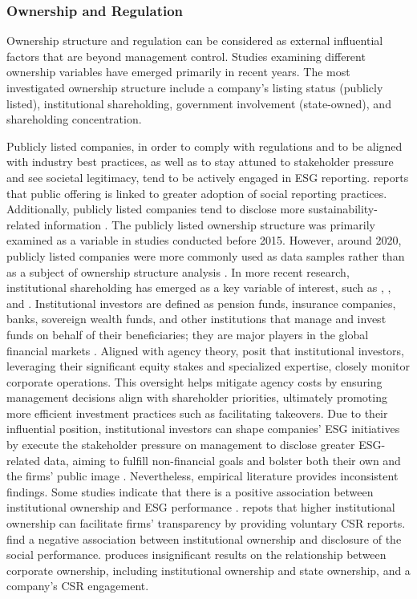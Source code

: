 \documentclass[
  authoryear]{elsarticle}
\begin{document}
\subsubsection{Ownership and Regulation}\label{ownership-and-regulation}

Ownership structure and regulation can be considered as external
influential factors that are beyond management control. Studies
examining different ownership variables have emerged primarily in recent
years. The most investigated ownership structure include a company's
listing status (publicly listed), institutional shareholding, government
involvement (state-owned), and shareholding concentration.

Publicly listed companies, in order to comply with regulations and to be
aligned with industry best practices, as well as to stay attuned to
stakeholder pressure and see societal legitimacy, tend to be actively
engaged in ESG reporting. \citet{HADDOCK2005} reports that public
offering is linked to greater adoption of social reporting practices.
Additionally, publicly listed companies tend to disclose more
sustainability-related information \citep{GAMERSCHLAG2011}. The publicly
listed ownership structure was primarily examined as a variable in
studies conducted before 2015. However, around 2020, publicly listed
companies were more commonly used as data samples rather than as a
subject of ownership structure analysis
\citep[e.g.][]{SAHASRANAMAM2020, AMEEN2022, ALOBAID2024}. In more recent
research, institutional shareholding has emerged as a key variable of
interest, such as \citet{DYCK2019}, \citet{CHEN2020}, and
\citet{AMEEN2022}. Institutional investors are defined as pension funds,
insurance companies, banks, sovereign wealth funds, and other
institutions that manage and invest funds on behalf of their
beneficiaries; they are major players in the global financial markets
\citep{AMEEN2022}. Aligned with agency theory, \citet{SHLEIFER1986}
posit that institutional investors, leveraging their significant equity
stakes and specialized expertise, closely monitor corporate operations.
This oversight helps mitigate agency costs by ensuring management
decisions align with shareholder priorities, ultimately promoting more
efficient investment practices such as facilitating takeovers. Due to
their influential position, institutional investors can shape companies'
ESG initiatives by execute the stakeholder pressure on management to
disclose greater ESG-related data, aiming to fulfill non-financial goals
and bolster both their own and the firms' public image
\citep{DYCK2019, GARCIA-SANCHEZ2020}. Nevertheless, empirical literature
provides inconsistent findings. Some studies indicate that there is a
positive association between institutional ownership and ESG performance
\citep{DYCK2019, CHEN2020, AMEEN2022, RAIMO2020}. \citet{ZHOU2019}
repots that higher institutional ownership can facilitate firms'
transparency by providing voluntary CSR reports. \citet{ALUCHNA2022}
find a negative association between institutional ownership and
disclosure of the social performance. \citet{QU2007} produces
insignificant results on the relationship between corporate ownership,
including institutional ownership and state ownership, and a company's
CSR engagement.
\end{document}
